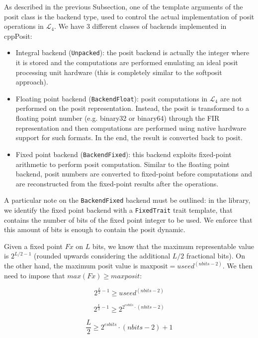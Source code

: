 As described in the previous Subsection, one of the template arguments of the posit class is the backend type, used to control the actual implementation of posit operations in $\mathcal{L}_4$.
We have 3 different classes of backends implemented in cppPosit:
\begin{itemize}
    \item Integral backend (\texttt{Unpacked}): the posit backend is actually the integer where it is stored and the computations are performed emulating an ideal posit processing unit hardware (this is completely similar to the softposit approach).
    \item Floating point backend (\texttt{BackendFloat}): posit computations in $\mathcal{L}_4$ are not performed on the posit representation. Instead, the posit is transformed to a floating point number (e.g. binary32 or binary64) through the FIR representation and then computations are performed using native hardware support for such formats. In the end, the result is converted back to posit. 
    \item Fixed point backend (\texttt{BackendFixed}): this backend exploits fixed-point arithmetic to perform posit computation. Similar to the floating point backend, posit numbers are converted to fixed-point before computations and are reconstructed from the fixed-point results after the operations.
\end{itemize}
A particular note on the \texttt{BackendFixed} backend must be outlined: in the library, we identify the fixed point backend with a \texttt{FixedTrait} trait template, that contains the number of bits of the fixed point integer to be used. We enforce that this amount of bits is enough to contain the posit dynamic. 

Given a fixed point $Fx$ on $L$ bits, we know that the maximum representable value is $2^{L/2 - 1}$ (rounded upwards considering the additional $L/2$ fractional bits). On the other hand, the maximum posit value is $\text{maxposit} = useed^{(nbits - 2)}$. We then need to impose that $max(Fx) \geq maxposit$: 

\begin{equation}
    2^{\frac{L}{2} - 1} \geq  useed^{(nbits - 2)}
\end{equation}

\begin{equation}
    2^{\frac{L}{2} - 1} \geq 2^{2^{esbits} \cdot (nbits - 2)}
\end{equation}

\begin{equation}
    \frac{L}{2} \geq 2^{esbits} \cdot (nbits - 2) + 1
\end{equation}

